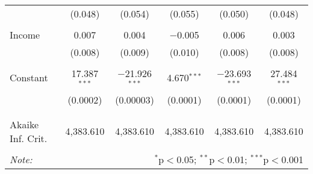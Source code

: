 \documentclass[
  letterpaper,
  DIV=11,
  numbers=noendperiod]{scrreprt}
\begin{document}
\begin{table}[H]
\begin{tabular}{@{\extracolsep{-10pt}}lccccc}
  & (0.048) & (0.054) & (0.055) & (0.050) & (0.048) \\ 
  & & & & & \\ 
 Income & 0.007 & 0.004 & $-$0.005 & 0.006 & 0.003 \\ 
  & (0.008) & (0.009) & (0.010) & (0.008) & (0.008) \\ 
  & & & & & \\ 
 Constant & 17.387$^{***}$ & $-$21.926$^{***}$ & 4.670$^{***}$ & $-$23.693$^{***}$ & 27.484$^{***}$ \\ 
  & (0.0002) & (0.00003) & (0.0001) & (0.0001) & (0.0001) \\ 
  & & & & & \\ 
\hline \\[-1.8ex] 
Akaike Inf. Crit. & 4,383.610 & 4,383.610 & 4,383.610 & 4,383.610 & 4,383.610 \\ 
\hline 
\hline \\[-1.8ex] 
\textit{Note:}  & \multicolumn{5}{r}{$^{*}$p$<$0.05; $^{**}$p$<$0.01; $^{***}$p$<$0.001} \\ 
\end{tabular} 
\end{table}
\end{document}
